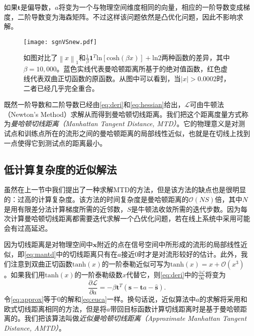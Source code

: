 如果$\mathbf{t}$是偏导数，$a$将变为一个与物理空间维度相同的向量，相应的一阶导数变成梯度，二阶导数变为海森矩阵。不过这样该问题依然是凸优化问题，因此不影响求解。

\begin{figure}[tb]
	\centering
	\texttt{[image: sgnVSnew.pdf]}
	\caption{如图对比了${\left\| x \right\|}_1$和$\frac{1}{\beta}\mathbf{1}^T\mathrm{ln}\left[ \mathrm{cosh} \left( \beta x \right) \right] + \mathrm{ln}2$两种函数的差异，其中$\beta=10,000$。蓝色实线代表曼哈顿距离所基于的绝对值函数，红色虚线代表双曲正切函数的原函数。从图中可以看到，当$|x|>0.0002$时，二者已经几乎完全重合。}
	\label{fig:sgnVSnew}
\end{figure}

既然一阶导数和二阶导数已经由\eqref{eq:deri}和\eqref{eq:hessian}给出，$\mathcal{L}$可由牛顿法（Newton's Method）求解从而得到曼哈顿切线距离。我们把这个距离度量方式称为\textit{曼哈顿切线距离（Manhattan Tangent Distance, MTD）}。它的物理意义是对测试点和训练点所在的流形之间的曼哈顿距离的局部线性近似，也就是在切线上找到一点使得它到测试点的距离最小。

\subsection{低计算复杂度的近似解法}

虽然在上一节中我们提出了一种求解MTD的方法，但是该方法的缺点也是很明显的：过高的计算复杂度。该方法的时间复杂度是曼哈顿距离的$\mathcal{O}(NS)$倍，其中$N$是用有限差分法计算梯度所需的近邻数，$S$是牛顿法收敛所需的迭代步数。因为每次计算曼哈顿切线距离都需要迭代求解一个凸优化问题，若在线上系统中采用可能会有过高延迟。

因为切线距离是对物理空间中$\mathbf{x}$附近的点在信号空间中所形成的流形的局部线性近似，即\eqref{eq:mantd}中的切线距离只有在$a$接近0时才是对流形较好的估计。此外，我们注意到双曲正切函数$\mathrm{tanh}(x)$的一阶泰勒近似可写为$\mathrm{tanh}(x) = x + \mathcal{O}\left( x^3 \right)$。如果我们用$\mathrm{tanh}(x)$的一阶泰勒级数$x$代替它，则\eqref{eq:deri}中的$\frac{\partial \mathcal{L}}{\partial a}$将变为
\begin{equation}
\frac{\partial \mathcal{L}}{\partial a} = -\beta \mathbf{t}^T \left( \mathbf{s} - \mathbf{t}a - \widehat{\mathbf{s}} \right). \label{eq:approx}
\end{equation}
令\eqref{eq:approx}等于0的解和\eqref{eq:euca}一样。换句话说，近似算法中$a$的求解将采用和欧式切线距离相同的方法，但是将$a$带回目标函数计算切线距离时是基于曼哈顿距离的。我们把该算法叫做\textit{近似曼哈顿切线距离（Approximate Manhattan Tangent Distance, AMTD）}。

